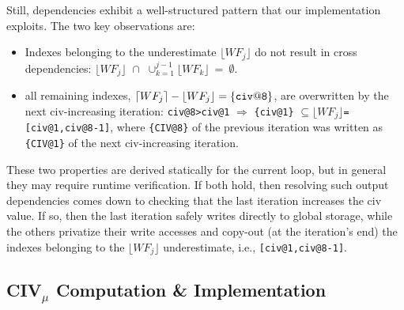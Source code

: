 \documentclass{sig-alternate}
\begin{document}
Still, dependencies exhibit a well-structured pattern that our 
implementation exploits. The two key observations are: 
\begin{itemize}
    \item Indexes belonging to the underestimate $\lfloor{}WF_{j}\rfloor$ 
            do not result in cross dependencies:
        $\lfloor WF_{j}\rfloor\mbox{~}\cap\mbox{~}\cup_{k=1}^{j-1}\lfloor WF_{k}\rfloor~=~\emptyset$.

    \item all remaining indexes, $\lceil WF_{j}\rceil - \lfloor WF_{j}\rfloor = {\tt\{civ@8\}}$,
        are overwritten by the next {\sc civ}-increasing iteration:
        {\tt{}civ@8>civ@1} $\Rightarrow$
        {\tt\{civ@1\}} $\subseteq\lfloor WF_{j}\rfloor${\tt=[civ@1,civ@8-1]},
        where {\tt\{CIV@8\}} of the previous iteration was written as {\tt\{CIV@1\}} 
        of the next {\sc civ}-increasing iteration.
\end{itemize}

%
%

These two properties are derived statically for the current loop, 
but in general they may require runtime verification. 
If both hold, then resolving such output dependencies comes down to checking that 
the last iteration increases the {\sc civ} value. 
If so, then the last iteration safely writes directly to global storage, 
while the others privatize their write accesses and copy-out 
(at the iteration's end) the indexes belonging to the $\lfloor WF_j\rfloor$ 
underestimate, 
i.e., {\tt[civ@1,civ@8-1]}.


\subsection{CIV$_\mu$ Computation \& Implementation }
\label{subsect:CivImplem}
\end{document}
